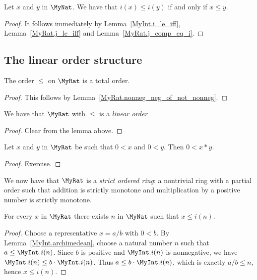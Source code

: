 \begin{lemma}
    \label{MyRat.i_le_iff}
    \leanok
    Let $x$ and $y$ in $\MyNat$. We have that $i(x) \leq i(y)$ if and only if $x \leq y$.
\end{lemma}
\begin{proof}
    \leanok
    It follows immediately by Lemma~\ref{MyInt.i_le_iff}, Lemma~\ref{MyRat.j_le_iff} and Lemma~\ref{MyRat.j_comp_eq_i}.
\end{proof}

\subsection{The linear order structure}

\begin{lemma}
    \label{MyRat.le_total}
    \leanok
    The order $\leq$ on $\MyRat$ is a total order.
\end{lemma}
\begin{proof}
    \leanok
This follows by Lemma~\ref{MyRat.nonneg_neg_of_not_nonneg}.
\end{proof}

\begin{lemma}
    \label{MyRat.linearOrder}
    \leanok
    We have that $\MyRat$ with $\leq$ is a \emph{linear order}
\end{lemma}
\begin{proof}
    \leanok
    Clear from the lemma above.
\end{proof}

\begin{lemma}
    \label{MyRat.mul_pos}
    \leanok
    Let $x$ and $y$ in $\MyRat$ be such that $0 < x$ and $0 < y$. Then $0 < x * y$.
\end{lemma}
\begin{proof}
    \leanok
Exercise.
\end{proof}

We now have that $\MyRat$ is a \emph{strict ordered ring}: a nontrivial ring with a partial order such that addition is strictly monotone and multiplication by a positive number is strictly monotone.

\begin{lemma}
    \label{MyRat.archimedean}
    \leanok
    For every $x$ in $\MyRat$ there exists $n$ in $\MyNat$ such that $x \leq i(n)$.
\end{lemma}
\begin{proof}
    \leanok
    Choose a representative $x = a/b$ with $0 < b$. By Lemma~\ref{MyInt.archimedean}, choose a
    natural number $n$ such that $a \leq \MyInt.i(n)$. Since $b$ is positive and $\MyInt.i(n)$ is
    nonnegative, we have $\MyInt.i(n) \leq b \cdot \MyInt.i(n)$. Thus
    $a \leq b \cdot \MyInt.i(n)$, which is exactly $a/b \leq n$, hence $x \leq i(n)$.
\end{proof}
